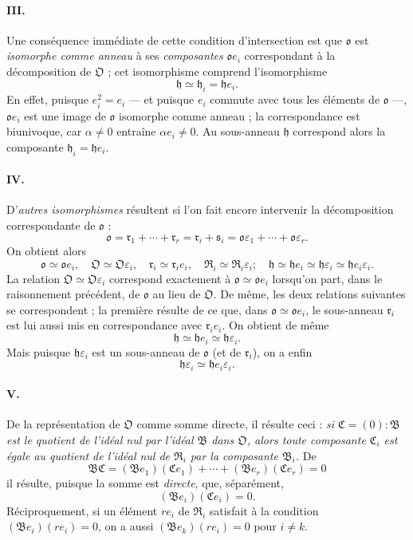 \paragraph{III.}
Une conséquence immédiate de cette condition d'intersection est que $\mathfrak o$ est \emph{isomorphe comme anneau} à ses \emph{composantes} $\mathfrak o e_i$ correspondant à la décomposition de $\mathfrak O$ ; cet isomorphisme comprend l'isomorphisme
\[
\mathfrak h\simeq\mathfrak h_i=\mathfrak h e_i.
\]
En effet, puisque $e_i^2=e_i$ --- et puisque $e_i$ commute avec tous les éléments de $\mathfrak o$ ---, $\mathfrak o e_i$ est une image de $\mathfrak o$ isomorphe comme anneau ; la correspondance est biunivoque, car $\alpha\ne0$ entraîne $\alpha e_i\ne0$. Au sous-anneau $\mathfrak h$ correspond alors la composante $\mathfrak h_i=\mathfrak h e_i$.

\paragraph{IV.}
D'\emph{autres isomorphismes} résultent si l'on fait encore intervenir la décomposition correspondante de $\mathfrak o$ :
\[
\mathfrak o=\mathfrak r_1+\cdots+\mathfrak r_r
=\mathfrak r_i+\mathfrak s_i
=\mathfrak o\varepsilon_1+\cdots+\mathfrak o\varepsilon_r.
\]
On obtient alors
\[
\mathfrak o\simeq\mathfrak o e_i,
\quad \mathfrak O\simeq\mathfrak O\varepsilon_i,
\quad \mathfrak r_i\simeq\mathfrak r_i e_i,
\quad \mathfrak R_i\simeq\mathfrak R_i\varepsilon_i;
\quad \mathfrak h\simeq\mathfrak h e_i\simeq\mathfrak h\varepsilon_i\simeq\mathfrak h e_i\varepsilon_i.
\]
La relation $\mathfrak O\simeq\mathfrak O\varepsilon_i$ correspond exactement à $\mathfrak o\simeq\mathfrak o e_i$ lorsqu'on part, dans le raisonnement précédent, de $\mathfrak o$ au lieu de $\mathfrak O$. De même, les deux relations suivantes se correspondent ; la première résulte de ce que, dans $\mathfrak o\simeq\mathfrak o e_i$, le sous-anneau $\mathfrak r_i$ est lui aussi mis en correspondance avec $\mathfrak r_i e_i$. On obtient de même
\[
\mathfrak h\simeq\mathfrak h e_i\simeq\mathfrak h\varepsilon_i.
\]
Mais puisque $\mathfrak h\varepsilon_i$ est un sous-anneau de $\mathfrak o$ (et de $\mathfrak r_i$), on a enfin
\[
\mathfrak h\varepsilon_i\simeq\mathfrak h e_i\varepsilon_i.
\]

\paragraph{V.}
De la représentation de $\mathfrak O$ comme somme directe, il résulte ceci : \emph{si $\mathfrak C=(0):\mathfrak B$ est le quotient de l'idéal nul par l'idéal $\mathfrak B$ dans $\mathfrak O$, alors toute composante $\mathfrak C_i$ est égale au quotient de l'idéal nul de $\mathfrak R_i$ par la composante $\mathfrak B_i$.} De
\[
\mathfrak B\mathfrak C=(\mathfrak B e_1)(\mathfrak C e_1)+\cdots+(\mathfrak B e_r)(\mathfrak C e_r)=0
\]
il résulte, puisque la somme est \emph{directe}, que, séparément,
\[
(\mathfrak B e_i)(\mathfrak C e_i)=0.
\]
Réciproquement, si un élément $r e_i$ de $\mathfrak R_i$ satisfait à la condition $(\mathfrak B e_i)(r e_i)=0$, on a aussi $(\mathfrak B e_k)(r e_i)=0$ pour $i\ne k$.

